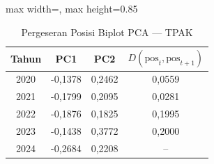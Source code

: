 \begin{table}[H]
\centering
\caption{Pergeseran Posisi Biplot PCA --- TPAK} \label{tab:appjarak_pca_loading_tpak}
\begin{adjustbox}{max width=\textwidth, max height=0.85\textheight}
\begin{tabular}{|c|c|c|c|}
\hline
\textbf{Tahun} & \textbf{PC1} & \textbf{PC2} & \textbf{$D(\text{pos}_t, \text{pos}_{t+1})$} \\
\hline
2020 & -0,1378 & 0,2462 & 0,0559 \\
2021 & -0,1799 & 0,2095 & 0,0281 \\
2022 & -0,1876 & 0,1825 & 0,1995 \\
2023 & -0,1438 & 0,3772 & 0,2000 \\
2024 & -0,2684 & 0,2208 & -- \\
\hline
\end{tabular}
\end{adjustbox}
\end{table}